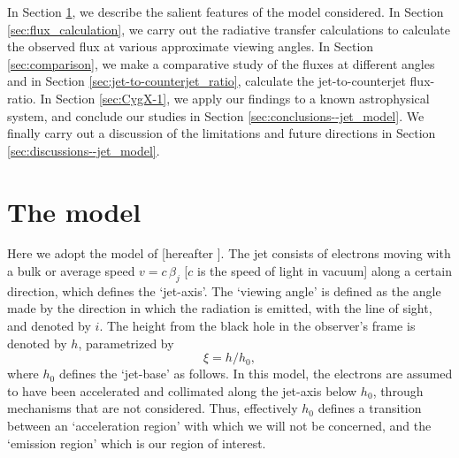 In Section \ref{sec:the_model}, we describe the salient features of the model considered. In Section \ref{sec:flux_calculation}, we carry out the radiative transfer calculations to calculate the observed flux at various approximate viewing angles. In Section \ref{sec:comparison}, we make a comparative study of the fluxes at different angles and in Section \ref{sec:jet-to-counterjet_ratio}, calculate the jet-to-counterjet flux-ratio. In Section \ref{sec:CygX-1}, we apply our findings to a known astrophysical system, and conclude our studies in Section \ref{sec:conclusions--jet_model}. We finally carry out a discussion of the limitations and future directions in Section \ref{sec:discussions--jet_model}.


\section{The model}
\label{sec:the_model}
Here we adopt the model of \cite{Zdziarski_et_al.-2012-MNRAS-MeV_tail_CX1} [hereafter ]. The jet consists of electrons moving with a bulk or average speed $ v = c \, \beta_j $ [$c$ is the speed of light in vacuum] along a certain direction, which defines the `jet-axis'. The `viewing angle' is defined as the angle made by the direction in which the radiation is emitted, with the line of sight, and denoted by $i$. The height from the black hole in the observer's frame is denoted by $h$, parametrized by
\begin{equation}
\xi = h / h_0,
\label{eq:xi_definition}
\end{equation}
where $h_0$ defines the `jet-base' as follows. In this model, the electrons are assumed to have been accelerated and collimated along the jet-axis below $h_0$, through mechanisms that are not considered. Thus, effectively $h_0$ defines a transition between an `acceleration region' with which we will not be concerned, and the `emission region' which is our region of interest.

